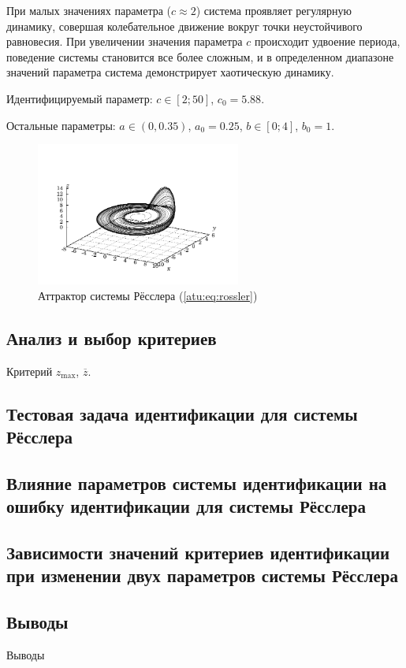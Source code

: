 При малых значениях параметра (\(c \approx 2 \))
система проявляет регулярную динамику,
совершая колебательное движение вокруг точки неустойчивого равновесия.
При увеличении значения параметра \(c\) происходит удвоение периода,
поведение системы становится все более сложным, и в определенном
диапазоне значений параметра система демонстрирует хаотическую динамику.

Идентифицируемый параметр:
$ c \in [2; 50] $, $c_0=5.88$.

Остальные параметры:
\( a \in (0, 0.35 ) \), $a_0=0.25$,
\(b \in[0;4] \), $b_0=1$.

\begin{figure}[htb!]
\centerline{\includegraphics[width=0.6\textwidth]{p/cha/ross_phase3.pdf} }
\caption{Аттрактор системы Рёсслера (\ref{atu:eq:rossler})}
\label{atu:f:ross_phase}
\end{figure}


\subsection{Анализ и выбор критериев}  %

Критерий
$ z_{\max}$, $ \overline{z} $.


\subsection{Тестовая задача идентификации для системы Рёсслера}  %



\subsection{Влияние параметров системы идентификации на ошибку идентификации для системы Рёсслера}  %


\subsection{Зависимости значений критериев идентификации при изменении двух параметров системы Рёсслера}  %




\subsection{Выводы}  %

Выводы




